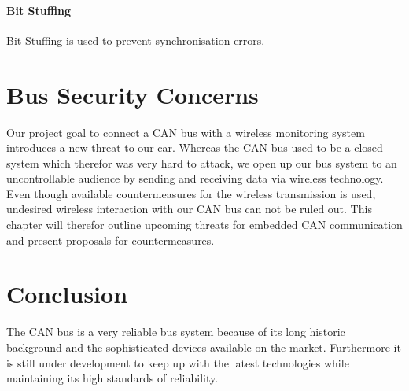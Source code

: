 	\paragraph{Bit Stuffing}
Bit Stuffing is used to prevent synchronisation errors.

\section{Bus Security Concerns}
Our project goal to connect a CAN bus with a wireless monitoring system
introduces a new threat to our car. Whereas the CAN bus used to be a closed
system which therefor was very hard to attack, we open up our bus
system to an uncontrollable audience by sending and receiving data via wireless
technology. Even though available countermeasures for the wireless
transmission is used, undesired wireless interaction with our CAN bus can not be
ruled out. This chapter will therefor outline upcoming threats for embedded CAN
communication and present proposals for countermeasures.

\section{Conclusion}
The CAN bus is a very reliable bus system because of its long historic
background and the sophisticated devices available on the market. Furthermore it
is still under development to keep up with the latest technologies while
maintaining its high standards of reliability.

